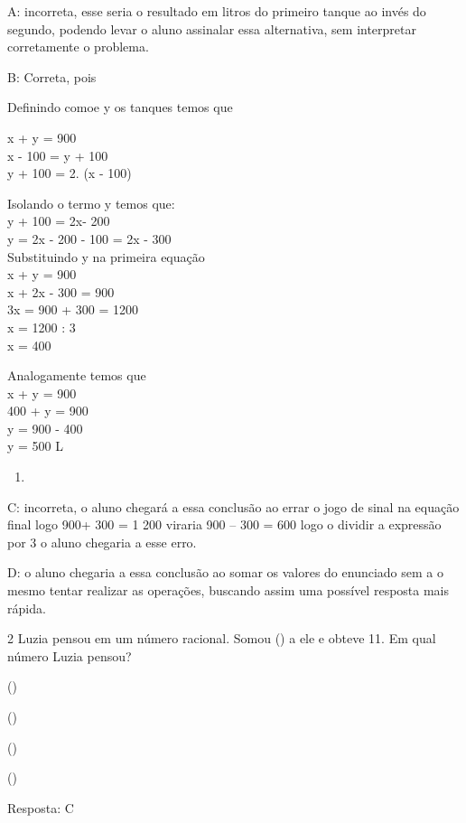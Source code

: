 A: incorreta, esse seria o resultado em litros do primeiro tanque ao
invés do segundo, podendo levar o aluno assinalar essa alternativa, sem
interpretar corretamente o problema.

B: Correta, pois

Definindo como\times e y os tanques temos que

x + y = 900\\
x - 100 = y + 100\\
y + 100 = 2. (x - 100)

Isolando o termo y temos que:\\
y + 100 = 2x- 200\\
y = 2x - 200 - 100 = 2x - 300\\
Substituindo y na primeira equação\\
x + y = 900\\
x + 2x - 300 = 900\\
3x = 900 + 300 = 1200\\
x = 1200 : 3\\
x = 400

Analogamente temos que\\
x + y = 900\\
400 + y = 900\\
y = 900 - 400\\
y = 500 L

\begin{enumerate}
\def\labelenumi{\Alph{enumi}.}
\setcounter{enumi}{1}
\tightlist

\item 
\end{enumerate}

C: incorreta, o aluno chegará a essa conclusão ao errar o jogo de sinal
na equação final logo 900+ 300 = 1 200 viraria 900 -- 300 = 600 logo o
dividir a expressão por 3 o aluno chegaria a esse erro.

D: o aluno chegaria a essa conclusão ao somar os valores do enunciado
sem a o mesmo tentar realizar as operações, buscando assim uma possível
resposta mais rápida.

\num{2} Luzia pensou em um número racional. Somou () a ele e
obteve 11. Em qual número Luzia pensou?

\item ()
\item ()
\item ()
\item ()

Resposta: C

